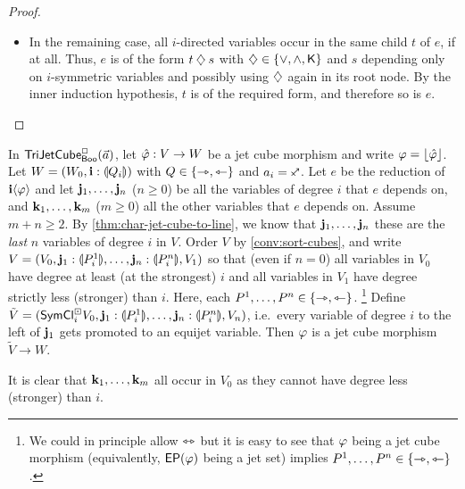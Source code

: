 \documentclass[a4paper]{article}
\begin{document}
\begin{proof}
\begin{itemize}
		\item In the remaining case, all $i$-directed variables occur in the same child $t$ of $e$, if at all.
		Thus, $e$ is of the form $t \mathbin{\diamondsuit} s$ with $\mathbin{\diamondsuit} \in \mathopen{}\left\{ {\vee}, {\wedge}, {\mathbin{\mathsf{K}}} \right\}\mathclose{}$ and $s$ depending only on $i$-symmetric variables and possibly using $\mathbin{\diamondsuit}$ again in its root node.
		By the inner induction hypothesis, $t$ is of the required form, and therefore so is $e$. \qedhere
	\end{itemize}
\end{proof}
\begin{lemma} \label{thm:left-of-connection}
	In $\mathsf{TriJetCube}^{\Box}_{\mathsf{Boo}}\mathopen{}\left( \vec a \right)\mathclose{}$, let $\hat {\varphi} : V \to W$ be a jet cube morphism and write $\varphi = \mathopen{}\left\lfloor \hat {\varphi} \right\rfloor\mathclose{}$.
	Let $W = (W_0, \mathbf{i} : {\llparenthesis Q_i \rrparenthesis})$ with $Q \in \mathopen{}\left\{ \rightarrowtriangle, \leftarrowtriangle \right\}\mathclose{}$ and $a_i = \ypolar$.
	Let $e$ be the reduction of $\mathbf{i} \langle \varphi \rangle$ and let $\mathbf{j}_1, \ldots, \mathbf{j}_n$ ($n \geq 0$) be all the variables of degree $i$ that $e$ depends on, and $\mathbf{k}_1, \ldots, \mathbf{k}_m$ ($m \geq 0$) all the other variables that $e$ depends on.
	Assume $m+n \geq 2$.
	By \cref{thm:char-jet-cube-to-line}, we know that $\mathbf{j}_1, \ldots, \mathbf{j}_n$ these are the \emph{last} $n$ variables of degree $i$ in $V$.
	Order $V$ by \cref{conv:sort-cubes}, and write $V = (V_0, \mathbf{j}_1 : {\llparenthesis P^1_i \rrparenthesis}, \ldots, \mathbf{j}_n : {\llparenthesis P^n_i \rrparenthesis}, V_1)$ so that (even if $n = 0$) all variables in $V_0$ have degree at least (at the strongest) $i$ and all variables in $V_1$ have degree strictly less (stronger) than $i$.
	Here, each $P^1, \ldots, P^n \in \mathopen{}\left\{ \rightarrowtriangle, \leftarrowtriangle \right\}\mathclose{}$.%
	\footnote{We could in principle allow $\leftrightarrowtriangle$ but it is easy to see that $\varphi$ being a jet cube morphism (equivalently, $\mathsf{EP}(\varphi)$ being a jet set) implies $P^1, \ldots, P^n \in \mathopen{}\left\{ \rightarrowtriangle, \leftarrowtriangle \right\}\mathclose{}$.}
	Define $\tilde V = (\mathsf{SymCl}^\boxdot_i V_0, \mathbf{j}_1 : {\llparenthesis P^1_i \rrparenthesis}, \ldots, \mathbf{j}_n : {\llparenthesis P^n_i \rrparenthesis}, V_n)$, i.e.\ every variable of degree $i$ to the left of $\mathbf{j}_1$ gets promoted to an equijet variable.
	Then $\varphi$ is a jet cube morphism $\tilde V \to W$.
\end{lemma}
It is clear that $\mathbf{k}_1, \ldots, \mathbf{k}_m$ all occur in $V_0$ as they cannot have degree less (stronger) than $i$.
\end{document}

